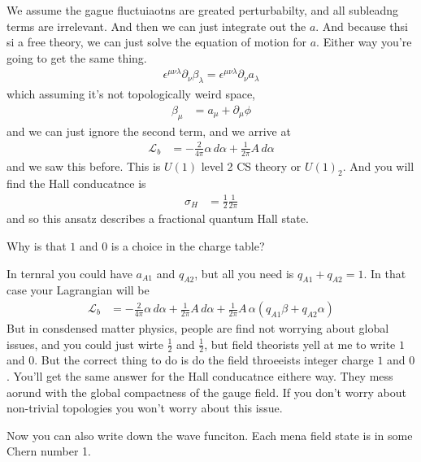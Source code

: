 We assume the gague fluctuiaotns are greated perturbabilty,
and all subleadng terms are irrelevant.
And then we can just integrate out the $a$.
And because thsi si a free theory,
we can just solve the equation of motion for $a$.
Either way you're going to get the same thing.
\begin{align}
    \epsilon^{\mu\nu\lambda}
    \partial_\nu \beta_{\lambda}
    =
    \epsilon^{\mu\nu\lambda}
    \partial_\nu a_\lambda
\end{align}
which assuming it's not topologically weird space,
\begin{align}
    \beta_{\mu} &=
    a_\mu + \partial_\mu \phi
\end{align}
and we can just ignore the second term,
and we arrive at
\begin{align}
    \mathcal{L}_b
    &=
    -\frac{2}{4\pi}
    \alpha\, d\alpha + \frac{1}{2\pi}A\, d\alpha
\end{align}
and we saw this before.
This is $U(1)$ level 2 CS theory or $U(1)_2$.
And you will find the Hall conducatnce is
\begin{align}
    \sigma_H
    &=
    \frac{1}{2} \frac{1}{2\pi}
\end{align}
and so this ansatz describes a fractional quantum Hall state.

\begin{question}
    Why is that $1$ and $0$ is a choice in the charge table?
\end{question}
In ternral you could have $a_{A1}$ and $q_{A2}$,
but all you need is $q_{A1}+q_{A2}=1$.
In that case your Lagrangian will be
\begin{align}
    \mathcal{L}_b
    &=
    -\frac{2}{4\pi}
    \alpha\, d\alpha + \frac{1}{2\pi}A\, d\alpha
    +
    \frac{1}{2\pi}
    A\, \alpha
    \left( 
    q_{A1} \beta +
    q_{A2} \alpha
    \right)
\end{align}
But in consdensed matter physics,
people are find not worrying about global issues,
and you could just wirte $\frac{1}{2}$ and $\frac{1}{2}$,
but field theorists yell at me to write $1$ and $0$.
But the correct thing to do is do the field throeeists integer charge $1$ and
$0$.
You'll get the same answer for the Hall conducatnce eithere way.
They mess aorund with the global compactness of the gauge field.
If you don't worry about non-trivial topologies you won't worry about this
issue.

Now you can also write down the wave funciton.
Each mena field state is in some Chern number 1.

